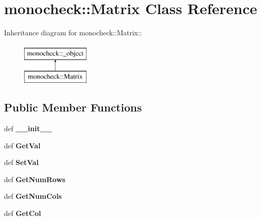 \hypertarget{classmonocheck_1_1Matrix}{
\section{monocheck::Matrix Class Reference}
\label{d3/d15/classmonocheck_1_1Matrix}
}
Inheritance diagram for monocheck::Matrix::\begin{figure}[H]
\begin{center}
\leavevmode
\includegraphics[height=2cm]{d3/d15/classmonocheck_1_1Matrix}
\end{center}
\end{figure}
\subsection*{Public Member Functions}
\begin{DoxyCompactItemize}
\item 
\hypertarget{classmonocheck_1_1Matrix_a24536d0f43c78981935dd94967a121cf}{
def {\bfseries \_\-\_\-init\_\-\_\-}}
\label{d3/d15/classmonocheck_1_1Matrix_a24536d0f43c78981935dd94967a121cf}

\item 
\hypertarget{classmonocheck_1_1Matrix_aa3a58278b48efcfff8e5c491b7f86b44}{
def {\bfseries GetVal}}
\label{d3/d15/classmonocheck_1_1Matrix_aa3a58278b48efcfff8e5c491b7f86b44}

\item 
\hypertarget{classmonocheck_1_1Matrix_ac3c442daf925b657fe290c72dae1271c}{
def {\bfseries SetVal}}
\label{d3/d15/classmonocheck_1_1Matrix_ac3c442daf925b657fe290c72dae1271c}

\item 
\hypertarget{classmonocheck_1_1Matrix_abdb690f5b480564be56ff839f6cd79e7}{
def {\bfseries GetNumRows}}
\label{d3/d15/classmonocheck_1_1Matrix_abdb690f5b480564be56ff839f6cd79e7}

\item 
\hypertarget{classmonocheck_1_1Matrix_afe4ec68e3ecf301292b417cc2daf1db3}{
def {\bfseries GetNumCols}}
\label{d3/d15/classmonocheck_1_1Matrix_afe4ec68e3ecf301292b417cc2daf1db3}

\item 
\hypertarget{classmonocheck_1_1Matrix_af023859e735f04776b64d225d58ec5a5}{
def {\bfseries GetCol}}
\label{d3/d15/classmonocheck_1_1Matrix_af023859e735f04776b64d225d58ec5a5}

\end{DoxyCompactItemize}

